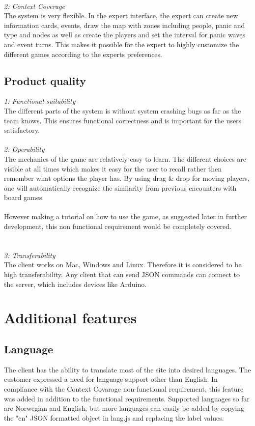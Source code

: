 \\\newline
\noindent \emph{2: Context Coverage}\\
The system is very flexible. In the expert interface, the expert can create new information cards, events, draw the map with zones including people, panic and type and nodes as well as create the players and set the interval for panic waves and event turns. This makes it possible for the expert to highly customize the different games according to the experts preferences.
\subsection{Product quality}

\emph{1: Functional suitability}\\
The different parts of the system is without system crashing bugs as far as the team knows. This ensures functional correctness and is important for the users satisfactory.\\

\\\newline
\noindent \emph{2: Operability}\\ 
The mechanics of the game are relatively easy to learn. The different choices are visible at all times which makes it easy for the user to recall rather then remember what options the player has. By using drag \& drop for moving players, one will automatically recognize the similarity from previous encounters with board games. \\
\\
However making a tutorial on how to use the game, as suggested later in further development, this non functional requirement would be completely covered.\\
\\
\\\newline
\emph{3: Transferability}\\
The client works on Mac, Windows and Linux. Therefore it is considered to be high transferability. Any client that can send JSON commands can connect to the server, which includes devices like Arduino.


\section{Additional features}


\subsection{Language}
The client has the ability to translate most of the site into desired languages. The customer expressed a need for language support other than English. In compliance with the Context Covarage non-functional requirement, this feature was added in addition to the functional requirements. Supported languages so far are Norwegian and English, but more languages can easily be added by copying the "en" JSON formatted object in lang.js and replacing the label values.\\

